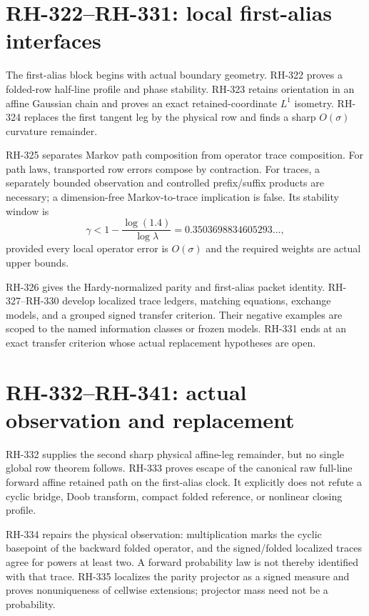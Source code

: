 \documentclass[11pt]{article}
\theoremstyle{definition}
\theoremstyle{remark}
\begin{document}
\section{RH-322--RH-331: local first-alias interfaces}

The first-alias block begins with actual boundary geometry.  RH-322 proves a
folded-row half-line profile and phase stability.  RH-323 retains orientation
in an affine Gaussian chain and proves an exact retained-coordinate
$L^1$ isometry.  RH-324 replaces the first tangent leg by the physical row
and finds a sharp $O(\sigma)$ curvature remainder.

RH-325 separates Markov path composition from operator trace composition.
For path laws, transported row errors compose by contraction.  For traces, a
separately bounded observation and controlled prefix/suffix products are
necessary; a dimension-free Markov-to-trace implication is false.  Its
stability window is
\[
 \gamma<1-\frac{\log(1.4)}{\log\lambda}
 =0.3503698834605293\ldots,
\]
provided every local operator error is $O(\sigma)$ and the required weights
are actual upper bounds.

RH-326 gives the Hardy-normalized parity and first-alias packet identity.
RH-327--RH-330 develop localized trace ledgers, matching equations, exchange
models, and a grouped signed transfer criterion.  Their negative examples
are scoped to the named information classes or frozen models.  RH-331 ends
at an exact transfer criterion whose actual replacement hypotheses are open.

\section{RH-332--RH-341: actual observation and replacement}

RH-332 supplies the second sharp physical affine-leg remainder, but no
single global row theorem follows.  RH-333 proves escape of the canonical raw
full-line forward affine retained path on the first-alias clock.  It
explicitly does not refute a cyclic bridge, Doob transform, compact folded
reference, or nonlinear closing profile.

RH-334 repairs the physical observation: multiplication marks the cyclic
basepoint of the backward folded operator, and the signed/folded localized
traces agree for powers at least two.  A forward probability law is not
thereby identified with that trace.  RH-335 localizes the parity projector as
a signed measure and proves nonuniqueness of cellwise extensions; projector
mass need not be a probability.
\end{document}
